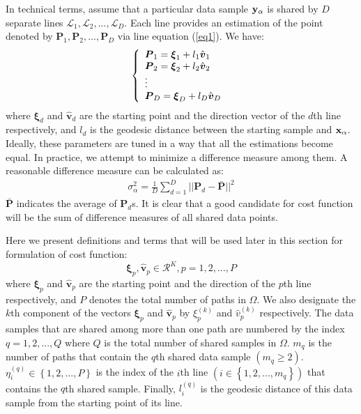 \documentclass[10pt,journal,cspaper,compsoc]{IEEEtran}
\begin{document}
In technical terms, assume that a particular data sample ${\bf y}_\alpha$ is shared by $D$ separate lines $\mathcal{L}_1, \mathcal{L}_2, ..., \mathcal{L}_D$. Each line provides an estimation of the point denoted by $\boldsymbol{P}_1,\boldsymbol{P}_2, ..., \boldsymbol{P}_D$ via line equation (\ref{eq1}). We have:
\begin{gather}
\label{eq10_1}
\left\{
  \begin{array}{l l}
	\boldsymbol{P}_1=\boldsymbol{\xi}_1+l_1\hat{\boldsymbol{v}}_1 \\
	\boldsymbol{P}_2=\boldsymbol{\xi}_2+l_2\hat{\boldsymbol{v}}_2 \\
	\vdots \\
	\boldsymbol{P}_D=\boldsymbol{\xi}_D+l_D\hat{\boldsymbol{v}}_D  
  \end{array} \right.\
\end{gather}
where $\boldsymbol{\xi}_d$ and $\hat{\boldsymbol{v}}_d$ are the starting point and the direction vector of the $d$th line respectively, and $l_d$ is the geodesic distance between the starting sample and ${\bf x}_\alpha$. Ideally, these parameters are tuned in a way that all the estimations become equal. In practice, we attempt to minimize a difference measure among them. A reasonable difference measure can be calculated as:
\begin{gather}
\label{eq10_2}
{\sigma}^2_\alpha=\frac{1}{D}\sum_{d=1}^D||\boldsymbol{P}_d - \bar{\boldsymbol{P}}||^2
\end{gather}
$\bar{\boldsymbol{P}}$ indicates the average of ${\boldsymbol{P}}_d$s. It is clear that a good candidate for cost function will be the sum of difference measures of all shared data points. 

Here we present definitions and terms that will be used later in this section for formulation of cost function:
\begin{equation}
\label{eq11}
\boldsymbol{\xi}_p, \hat{\boldsymbol{v}}_p  \in \mathcal{R}^K,   p=1,2,...,P
\end{equation}
where $\boldsymbol{\xi}_p$ and $\hat{\boldsymbol{v}}_p$ are the starting point and the direction of the $p$th line respectively, and $P$ denotes the total number of paths in $\Omega$. We also designate the $k$th component of the vectors $\boldsymbol{\xi}_p$ and $\hat{\boldsymbol{v}}_p$ by $\xi_p^{(k)}$ and $\hat{v}_p^{(k)}$ respectively. The data samples that are shared among more than one path are numbered by the index $q={1,2,...,Q}$ where $Q$ is the total number of shared samples in $\Omega$. $m_q$ is the number of paths that contain the $q$th shared data sample $(m_q\geq2)$. $\eta_i^{(q)}\in\left\{1,2,...,P\right\}$ is the index of the $i$th line $(i\in\left\{1,2,...,m_q\right\})$ that contains the $q$th shared sample. Finally, $l_i^{(q)}$ is the geodesic distance of this data sample from the starting point of its line.
\end{document}
